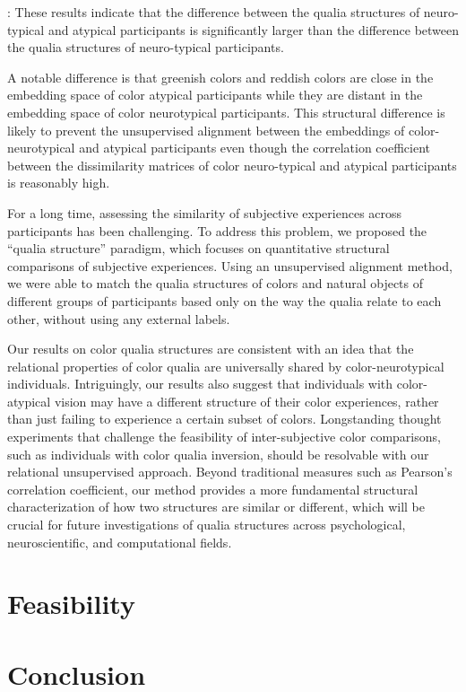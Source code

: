 \documentclass[
  authoryear]{elsarticle}
\begin{document}
\citet{kawakita2023}: These results indicate that the difference between
the qualia structures of neuro-typical and atypical participants is
significantly larger than the difference between the qualia structures
of neuro-typical participants.

A notable difference is that greenish colors and reddish colors are
close in the embedding space of color atypical participants while they
are distant in the embedding space of color neurotypical participants.
This structural difference is likely to prevent the unsupervised
alignment between the embeddings of color-neurotypical and atypical
participants even though the correlation coefficient between the
dissimilarity matrices of color neuro-typical and atypical participants
is reasonably high.

For a long time, assessing the similarity of subjective experiences
across participants has been challenging. To address this problem, we
proposed the ``qualia structure'' paradigm, which focuses on
quantitative structural comparisons of subjective experiences. Using an
unsupervised alignment method, we were able to match the qualia
structures of colors and natural objects of different groups of
participants based only on the way the qualia relate to each other,
without using any external labels.

Our results on color qualia structures are consistent with an idea that
the relational properties of color qualia are universally shared by
color-neurotypical individuals. Intriguingly, our results also suggest
that individuals with color-atypical vision may have a different
structure of their color experiences, rather than just failing to
experience a certain subset of colors. Longstanding thought experiments
that challenge the feasibility of inter-subjective color comparisons,
such as individuals with color qualia inversion, should be resolvable
with our relational unsupervised approach. Beyond traditional measures
such as Pearson's correlation coefficient, our method provides a more
fundamental structural characterization of how two structures are
similar or different, which will be crucial for future investigations of
qualia structures across psychological, neuroscientific, and
computational fields.

\section{Feasibility}\label{feasibility}

\section{Conclusion}\label{conclusion}
\end{document}
